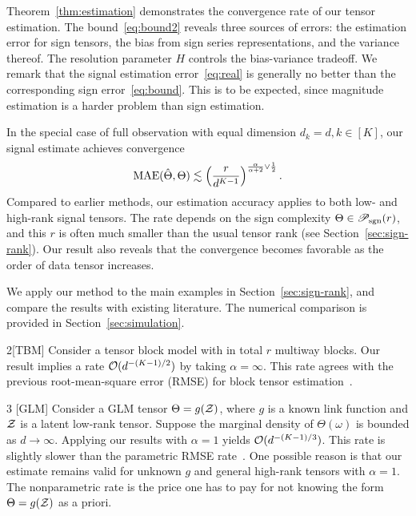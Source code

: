 \documentclass[11pt]{article}
\theoremstyle{plain}
\theoremstyle{definition}
\def\caliP{\mathscr{P}_{\textup{sgn}}}
\begin{document}
Theorem~\ref{thm:estimation} demonstrates the convergence rate of our tensor estimation. The bound~\eqref{eq:bound2} reveals three sources of errors: the estimation error for sign tensors, the bias from sign series representations, and the variance thereof. The resolution parameter $H$ controls the bias-variance tradeoff. We remark that the signal estimation error~\eqref{eq:real} is generally no better than the corresponding sign error~\eqref{eq:bound}. This is to be expected, since magnitude estimation is  a harder problem than sign estimation. 

In the special case of full observation with equal dimension $d_k=d, k\in[K]$, our signal estimate achieves convergence
\begin{equation}
\textup{MAE}(\hat \Theta, \Theta)\lesssim \left(r\over d^{K-1}\right)^{{\alpha \over \alpha+2} \vee {1\over 2}}.
\end{equation}
Compared to earlier methods, our estimation accuracy applies to both low- and high-rank signal tensors. The rate depends on the sign complexity $\Theta\in\caliP(r)$, and this $r$ is often much smaller than the usual tensor rank (see Section~\ref{sec:sign-rank}). Our result also reveals that the convergence becomes favorable as the order of data tensor increases. 

We apply our method to the main examples in Section~\ref{sec:sign-rank}, and compare the results with existing literature. The numerical comparison is provided in Section~\ref{sec:simulation}. \\

\begin{customexample}{2}[TBM]
Consider a tensor block model with in total $r$ multiway blocks. Our result implies a rate $\mathcal{O}(d^{-(K-1)/2})$ by taking $\alpha=\infty$. This rate agrees with the  previous root-mean-square error (RMSE) for block tensor estimation~\citep{wang2019multiway}.\\
\end{customexample}

\begin{customexample}{3} [GLM] 
Consider a GLM tensor $\Theta=g(\mathcal{Z})$, where $g$ is a known link function and $\mathcal{Z}$ is a latent low-rank tensor. Suppose the marginal density of $\Theta(\omega)$ is bounded as $d\to\infty$. Applying our results with $\alpha=1$ yields $\mathcal{O}(d^{-(K-1)/3})$. This rate is slightly slower than the parametric RMSE rate~\citep{zhang2018tensor,wang2018learning}. One possible reason is that our estimate remains valid for unknown $g$ and general high-rank tensors with $\alpha=1$. The nonparametric rate is the price one has to pay for not knowing the form $\Theta=g(\mathcal{Z})$ as a priori. 
\end{customexample}
\end{document}
